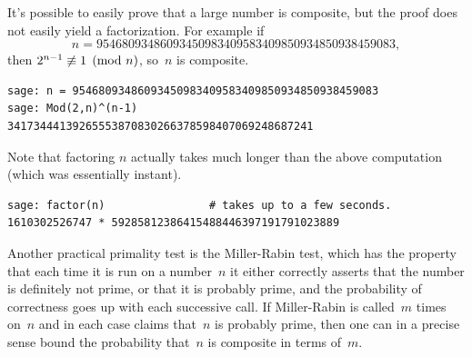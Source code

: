 \begin{sg}
  It's possible to easily prove that a large number is composite, but the
proof does not easily yield a factorization.  For example if
$$
  n = 95468093486093450983409583409850934850938459083,
$$
then $2^{n-1}\not\equiv 1\pmod{n}$, so~$n$ is composite.
\begin{verbatim}
sage: n = 95468093486093450983409583409850934850938459083
sage: Mod(2,n)^(n-1)
34173444139265553870830266378598407069248687241
\end{verbatim}%
Note that factoring $n$ actually takes much longer than the above
computation (which was essentially instant).
\begin{verbatim}
sage: factor(n)                # takes up to a few seconds.
1610302526747 * 59285812386415488446397191791023889
\end{verbatim}
\end{sg}

Another practical primality test is the Miller-Rabin test, which has
the property that each time it is run on a number~$n$ it either
correctly asserts that the number is definitely not prime, or that it is
probably prime, and the probability of correctness goes up with each
successive call.
If Miller-Rabin is called~$m$ times on~$n$ and in
each case claims that~$n$ is probably prime, then
one can in a precise sense bound the probability
that~$n$ is composite in terms of~$m$.

